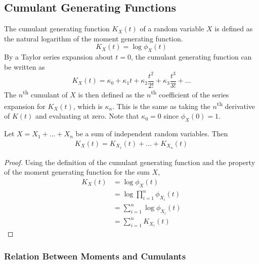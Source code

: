 \documentclass[11pt]{report} %
\begin{document}
\subsection{Cumulant Generating Functions \cite{Small2010}}

The cumulant generating function $K_{X}\left(t\right)$ of a random variable $X$ is defined as the natural logarithm of the moment generating function.
\begin{equation}
K_{X}\left(t\right) = \log\phi_{X}\left(t\right)
\end{equation}
By a Taylor series expansion about $t = 0$, the cumulant generating function can be written as
\begin{equation}
K_{X}\left(t\right) = \kappa_{0} + \kappa_{1}t + \kappa_{2}\dfrac{t^{2}}{2!} + \kappa_{3}\dfrac{t^{3}}{3!} + \dots
\end{equation}
The $n$\textsuperscript{th} cumulant of $X$ is then defined as the $n$\textsuperscript{th} coefficient of the series expansion for $K_{X}\left(t\right)$, which is $\kappa_{n}$. This is the same as taking the $n$\textsuperscript{th} derivative of $K\left(t\right)$ and evaluating at zero. Note that $\kappa_{0} = 0$ since $\phi_{X}\left(0\right) = 1$.

\begin{theorem}
Let $X = X_{1} + \dots  + X_{n}$ be a sum of independent random variables. Then
\begin{align}
K_{X}\left(t\right) = K_{X_{1}}\left(t\right) + \dots + K_{X_{n}}\left(t\right)
\end{align}
\end{theorem}
\begin{proof}
Using the definition of the cumulant generating function and the property of the moment generating function for the sum $X$,
\begin{align}
K_{X}\left(t\right) &= \log\phi_{X}\left(t\right) \\
&= \log\prod_{i = 1}^{n}\phi_{X_{i}}\left(t\right) \\
&= \sum_{i = 1}^{n}\log\phi_{X_{i}}\left(t\right) \\
&= \sum_{i = 1}^{n}K_{X_{i}}\left(t\right)
\end{align}
\end{proof}

\subsubsection{Relation Between Moments and Cumulants}
\end{document}
